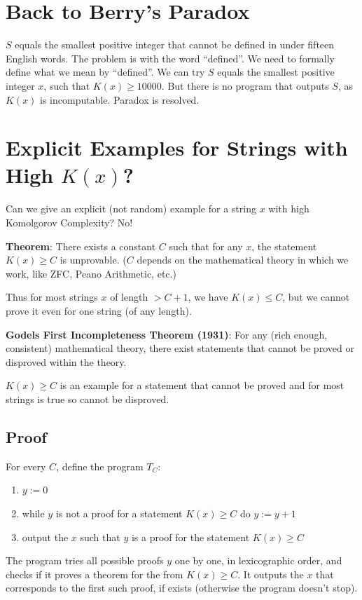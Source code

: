 \documentclass{article}
\begin{document}
\section{Back to Berry's Paradox}

$S$ equals the smallest positive integer that cannot be defined in under fifteen English words. The problem is with the word ``defined''. We need to formally define what we mean by ``defined''. We can try $S$ equals the smallest positive integer $x$, such that $K(x)\geq 10000$. But there is no program that outputs $S$, as $K(x)$ is incomputable. Paradox is resolved.

\section{Explicit Examples for Strings with High $K(x)$?}
Can we give an explicit (not random) example for a string $x$ with high Komolgorov Complexity? No!

\textbf{Theorem}: There exists a constant $C$ such that for any $x$, the statement $K(x)\geq C$ is unprovable. ($C$ depends on the mathematical theory in which we work, like ZFC, Peano Arithmetic, etc.)

Thus for most strings $x$ of length $>C+1$, we have $K(x)\leq C$, but we cannot prove it even for one string (of any length).

\textbf{Godels First Incompleteness Theorem (1931)}: For any (rich enough, consistent) mathematical theory, there exist statements that cannot be proved or disproved within the theory. 

$K(x)\geq C$ is an example for a statement that cannot be proved and for most strings is true so cannot be disproved.

\subsection{Proof}

For every $C$, define the program $T_C$:
\begin{enumerate}
    \item $y := 0$
    \item while $y$ is not a proof for a statement $K(x)\geq C$ do $y:= y +1$
    \item output the $x$ such that $y$ is a proof for the statement $K(x) \geq C$
\end{enumerate}
The program tries all possible proofs $y$ one by one, in lexicographic order, and checks if it proves a theorem for the from $K(x)\geq C$. It outputs the $x$ that corresponds to the first such proof, if exists (otherwise the program doesn't stop).
\end{document}
